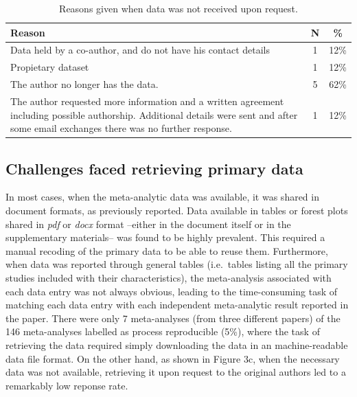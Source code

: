 \documentclass[
  ,jou, a4paper,floatsintext]{apa6}
\begin{document}
\begin{table}

\caption{\label{tab:unnamed-chunk-2}Reasons given when data was not received upon request.}
\centering
\begin{tabular}[t]{>{\raggedright\arraybackslash}p{7cm}cc}
\toprule
Reason & N & \%\\
\midrule
Data held by a co-author, and do not have his contact details & 1 & 12\%\\
Propietary dataset & 1 & 12\%\\
The author no longer has the data. & 5 & 62\%\\
The author requested more information and a written agreement including possible authorship. 
                                                      Additional details were sent and after some email exchanges there was no further response. & 1 & 12\%\\
\bottomrule
\end{tabular}
\end{table}

\hypertarget{challenges-faced-retrieving-primary-data}{%
\subsection{Challenges faced retrieving primary data}\label{challenges-faced-retrieving-primary-data}}

In most cases, when the meta-analytic data was available, it was shared in document formats, as previously reported. Data available in tables or forest plots shared in \emph{pdf} or \emph{docx} format --either in the document itself or in the supplementary materials-- was found to be highly prevalent. This required a manual recoding of the primary data to be able to reuse them. Furthermore, when data was reported through general tables (i.e.~tables listing all the primary studies included with their characteristics), the meta-analysis associated with each data entry was not always obvious, leading to the time-consuming task of matching each data entry with each independent meta-analytic result reported in the paper. There were only 7 meta-analyses (from three different papers) of the 146 meta-analyses labelled as process reproducible (5\%), where the task of retrieving the data required simply downloading the data in an machine-readable data file format.
On the other hand, as shown in Figure 3c, when the necessary data was not available, retrieving it upon request to the original authors led to a remarkably low reponse rate.
\end{document}
